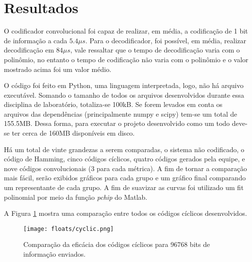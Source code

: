 \section{Resultados}
O codificador convolucional foi capaz de realizar, em média, a codificação de 1 bit de informação a cada $5.4\mu s$. Para o decodificador, foi possível, em média, realizar decodificação em $84\mu s$, vale ressaltar que o tempo de decodificação varia com o polinômio, no entanto o tempo de codificação não varia com o polinômio e o valor mostrado acima foi um valor médio.

O código foi feito em Python, uma linguagem interpretada, logo, não há arquivo executável. Somando o tamanho de todos os arquivos desenvolvidos durante essa disciplina de laboratório, totaliza-se 100kB. Se forem levados em conta os arquivos das dependências (principalmente numpy e scipy) tem-se um total de 155.5MB. Dessa forma, para executar o projeto desenvolvido como um todo deve-se ter cerca de 160MB disponíveis em disco.

Há um total de vinte grandezas a serem comparadas, o sistema não codificado, o código de Hamming, cinco códigos cíclicos, quatro códigos gerados pela equipe, e nove códigos convolucionais (3 para cada métrica). A fim de tornar a comparação mais fácil, serão exibidos gráficos para cada grupo e um gráfico final comparando um representante de cada grupo. A fim de suavizar as curvas foi utilizado um fit polinomial por meio da função \textit{pchip} do Matlab.

A Figura \ref{fig:cyclic} mostra uma comparação entre todos os códigos cíclicos desenvolvidos.

\begin{figure}[ht]
	\centering
	\captionsetup{justification=centering}
	\texttt{[image: floats/cyclic.png]}
	\caption{\label{fig:cyclic}Comparação da eficácia dos códigos cíclicos para 96768 bits de informação enviados.}
\end{figure}



